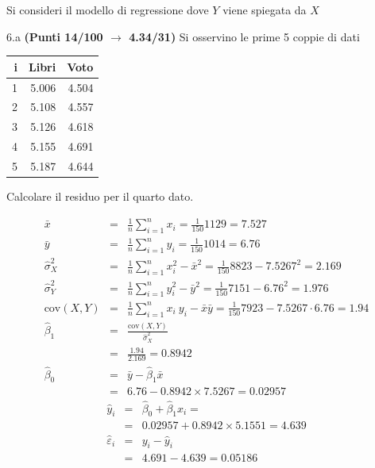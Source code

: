 \documentclass[
  11pt,
]{book}
\theoremstyle{mytheoremstyle}
\theoremstyle{mydefstyle}
\newenvironment{sol}
  {
  \begin{tcolorbox}[enhanced,breakable,arc=0.1mm,boxrule=1pt,colback=white,colframe=iblue,
  title=\bf \fontfamily{lmss}\selectfont \hspace{.5 cm} Soluzione,drop fuzzy shadow]

}{
\end{tcolorbox}
  }
\begin{document}
Si consideri il modello di regressione dove \(Y\) viene spiegata da \(X\)

6.a \textbf{(Punti 14/100 \(\rightarrow\) 4.34/31)} Si osservino le prime 5 coppie di dati

\begin{table}[H]
\centering
\begin{tabular}{rrr}
\toprule
i & Libri & Voto\\
\midrule
1 & 5.006 & 4.504\\
2 & 5.108 & 4.557\\
3 & 5.126 & 4.618\\
4 & 5.155 & 4.691\\
5 & 5.187 & 4.644\\
\bottomrule
\end{tabular}
\end{table}

Calcolare il residuo per il quarto dato.

\begin{sol}
\begin{eqnarray*}
           \bar x &=&\frac 1 n\sum_{i=1}^n x_i = \frac {1}{ 150 }  1129 =  7.527 \\
           \bar y &=&\frac 1 n\sum_{i=1}^n y_i = \frac {1}{ 150 }  1014 =  6.76 \\
           \hat\sigma_X^2&=&\frac 1 n\sum_{i=1}^n x_i^2-\bar x^2=\frac {1}{ 150 }  8823  - 7.5267 ^2= 2.169 \\
           \hat\sigma_Y^2&=&\frac 1 n\sum_{i=1}^n y_i^2-\bar y^2=\frac {1}{ 150 }  7151  - 6.76 ^2= 1.976 \\
           \text{cov}(X,Y)&=&\frac 1 n\sum_{i=1}^n x_i~y_i-\bar x\bar y=\frac {1}{ 150 }  7923 - 7.5267 \cdot 6.76 = 1.94 \\
           \hat\beta_1 &=& \frac{\text{cov}(X,Y)}{\hat\sigma_X^2} \\
                    &=& \frac{ 1.94 }{ 2.169 }  =  0.8942 \\
           \hat\beta_0 &=& \bar y - \hat\beta_1 \bar x\\
                    &=&  6.76 - 0.8942 \times  7.5267 = 0.02957 
         \end{eqnarray*}\begin{eqnarray*}
\hat y_i &=&\hat\beta_0+\hat\beta_1 x_i=\\ 
&=& 0.02957 + 0.8942 \times 5.1551 = 4.639 \\ 
\hat \varepsilon_i &=& y_i-\hat y_i\\ 
&=& 4.691 - 4.639 = 0.05186  
\end{eqnarray*}

\end{sol}
\end{document}
